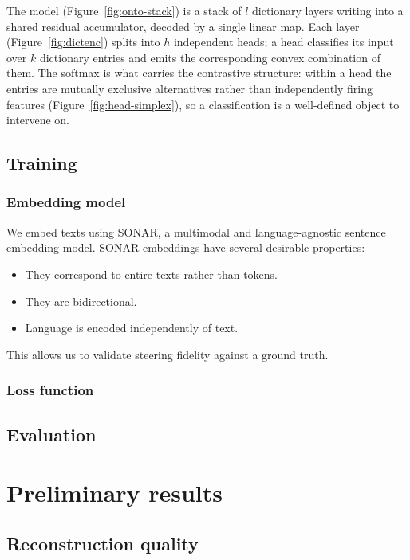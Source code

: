 The model (Figure~\ref{fig:onto-stack}) is a stack of $l$ dictionary layers
writing into a shared residual accumulator, decoded by a single linear map.
Each layer (Figure~\ref{fig:dictenc}) splits into $h$ independent heads; a head
classifies its input over $k$ dictionary entries and emits the corresponding
convex combination of them. The softmax is what carries the contrastive
structure: within a head the entries are mutually exclusive alternatives rather
than independently firing features (Figure~\ref{fig:head-simplex}), so a
classification is a well-defined object to intervene on.



\subsection{Training}

\subsubsection{Embedding model}
We embed texts using SONAR\cite{sonar}, a multimodal and language-agnostic sentence embedding 
model. SONAR embeddings have several desirable properties:
\begin{itemize}
	\item They correspond to entire texts rather than tokens.
	\item They are bidirectional.
	\item Language is encoded independently of text.
\end{itemize}
This allows us to validate steering fidelity against a ground truth.

\subsubsection{Loss function}

\subsection{Evaluation}

\section{Preliminary results}

\subsection{Reconstruction quality}

